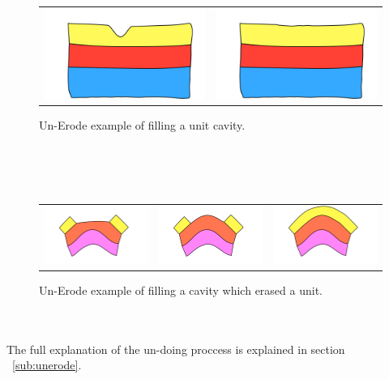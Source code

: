 \documentclass[12pt, a4paper]{report} %
\begin{document}
\begin{figure}[H]
\centering
\begin{tabular}{@{}cc@{}}
\includegraphics[width=.35\textwidth]{unErodeUpDescription0.png}&
\includegraphics[width=.35\textwidth]{unErodeUpDescription1.png}\\
\end{tabular}
\caption{Un-Erode example of filling a unit cavity.}
\label{unerodeeg}
\end{figure}
\\\\\
\begin{figure}[H]
\centering
\begin{tabular}{@{}ccc@{}}
\includegraphics[width=.35\textwidth]{unErodeConvexDescription0.png}&
\includegraphics[width=.35\textwidth]{unErodeConvexDescription1.png}&
\includegraphics[width=.35\textwidth]{unErodeConvexDescription2.png}\\
\end{tabular}
\caption{Un-Erode example of filling a cavity which erased a unit.}
\label{unerodecveg}
\end{figure}\\\\
The full explanation of the un-doing proccess is explained in section ~\ref{sub:unerode}.
\end{document}
